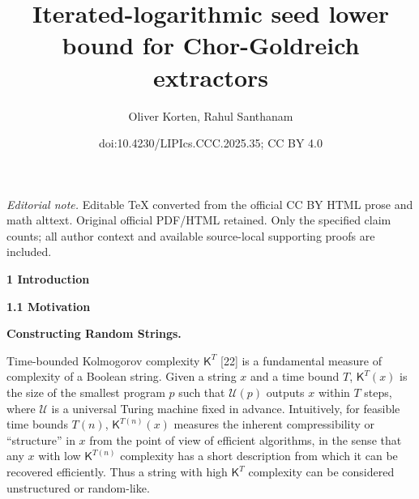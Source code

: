 \documentclass[10pt,a4paper]{article}
\title{Iterated-logarithmic seed lower bound for Chor-Goldreich extractors}
\author{Oliver Korten, Rahul Santhanam}
\date{doi:10.4230/LIPIcs.CCC.2025.35; CC BY 4.0}
\begin{document}
\maketitle
\noindent\textit{Editorial note.} Editable TeX converted from the official CC BY HTML prose and math alttext. Original official PDF/HTML retained. Only the specified claim counts; all author context and available source-local supporting proofs are included.\par\medskip


\par\medskip\noindent\textbf{
1 Introduction}\par




\par\medskip\noindent\textbf{
1.1 Motivation}\par




\par\medskip\noindent\textbf{Constructing Random Strings.}\par




Time-bounded Kolmogorov complexity ${\mathsf{K}}^{T}$ [22] is a fundamental measure of complexity of a Boolean string. Given a string $x$ and a time bound $T$, ${\mathsf{K}}^{T}(x)$ is the size of the smallest program $p$ such that $\mathcal{U}(p)$ outputs $x$ within $T$ steps, where $\mathcal{U}$ is a universal Turing machine fixed in advance. Intuitively, for feasible time bounds $T(n)$, ${\mathsf{K}}^{T(n)}(x)$ measures the inherent compressibility or “structure” in $x$ from the point of view of efficient algorithms, in the sense that any $x$ with low ${\mathsf{K}}^{T(n)}$ complexity has a short description from which it can be recovered efficiently. Thus a string with high ${\mathsf{K}}^{T}$ complexity can be considered unstructured or random-like.\par
\end{document}
